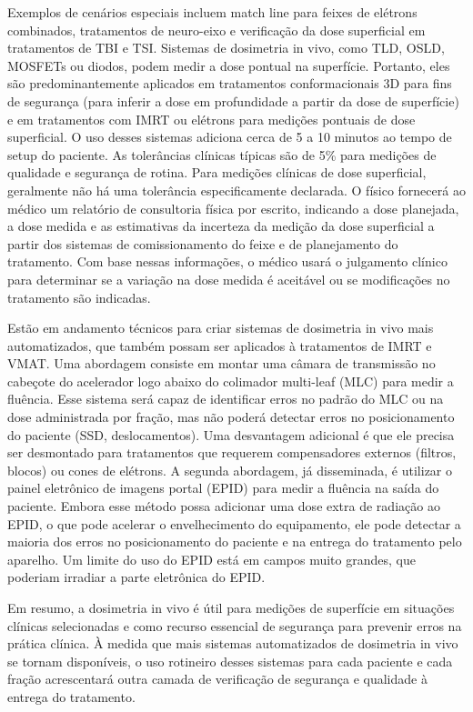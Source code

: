 \documentclass[11pt,a4paper]{article}
\begin{document}
	Exemplos de cenários especiais incluem match line para feixes de elétrons combinados, tratamentos de neuro-eixo e verificação da dose superficial em tratamentos de TBI e TSI. Sistemas de dosimetria in vivo, como TLD, OSLD, MOSFETs ou diodos, podem medir a dose pontual na superfície. Portanto, eles são predominantemente aplicados em tratamentos conformacionais 3D para fins de segurança (para inferir a dose em profundidade a partir da dose de superfície) e em tratamentos com IMRT ou elétrons para medições pontuais de dose superficial. O uso desses sistemas adiciona cerca de 5 a 10 minutos ao tempo de setup do paciente. As tolerâncias clínicas típicas são de 5\% para medições de qualidade e segurança de rotina. Para medições clínicas de dose superficial, geralmente não há uma tolerância especificamente declarada. O físico fornecerá ao médico um relatório de consultoria física por escrito, indicando a dose planejada, a dose medida e as estimativas da incerteza da medição da dose superficial a partir dos sistemas de comissionamento do feixe e de planejamento do tratamento. Com base nessas informações, o médico usará o julgamento clínico para determinar se a variação na dose medida é aceitável ou se modificações no tratamento são indicadas.

	Estão em andamento técnicos para criar sistemas de dosimetria in vivo mais automatizados, que também possam ser aplicados à tratamentos de IMRT e VMAT. Uma abordagem consiste em montar uma câmara de transmissão no cabeçote do acelerador logo abaixo do colimador multi-leaf (MLC) para medir a fluência. Esse sistema será capaz de identificar erros no padrão do MLC ou na dose administrada por fração, mas não poderá detectar erros no posicionamento do paciente (SSD, deslocamentos). Uma desvantagem adicional é que ele precisa ser desmontado para tratamentos que requerem compensadores externos (filtros, blocos) ou cones de elétrons. A segunda abordagem, já disseminada, é utilizar o painel eletrônico de imagens portal (EPID) para medir a fluência na saída do paciente. Embora esse método possa adicionar uma dose extra de radiação ao EPID, o que pode acelerar o envelhecimento do equipamento, ele pode detectar a maioria dos erros no posicionamento do paciente e na entrega do tratamento pelo aparelho. Um limite do uso do EPID está em campos muito grandes, que poderiam irradiar a parte eletrônica do EPID.

	Em resumo, a dosimetria in vivo é útil para medições de superfície em situações clínicas selecionadas e como recurso essencial de segurança para prevenir erros na prática clínica. À medida que mais sistemas automatizados de dosimetria in vivo se tornam disponíveis, o uso rotineiro desses sistemas para cada paciente e cada fração acrescentará outra camada de verificação de segurança e qualidade à entrega do tratamento.
\end{document}
